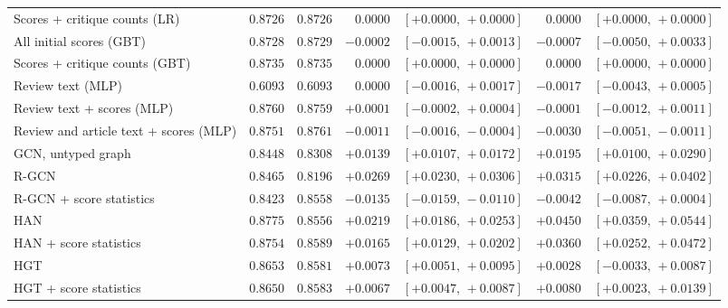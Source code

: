 \begin{table}[t]
\begin{tabular}{@{}lrrrrrr@{}}
Scores + critique counts (LR) & $0.8726$ & $0.8726$ & $0.0000$ & $[+0.0000,\,+0.0000]$ & $0.0000$ & $[+0.0000,\,+0.0000]$ \\
All initial scores (GBT) & $0.8728$ & $0.8729$ & $-0.0002$ & $[-0.0015,\,+0.0013]$ & $-0.0007$ & $[-0.0050,\,+0.0033]$ \\
Scores + critique counts (GBT) & $0.8735$ & $0.8735$ & $0.0000$ & $[+0.0000,\,+0.0000]$ & $0.0000$ & $[+0.0000,\,+0.0000]$ \\
Review text (MLP) & $0.6093$ & $0.6093$ & $0.0000$ & $[-0.0016,\,+0.0017]$ & $-0.0017$ & $[-0.0043,\,+0.0005]$ \\
Review text + scores (MLP) & $0.8760$ & $0.8759$ & $+0.0001$ & $[-0.0002,\,+0.0004]$ & $-0.0001$ & $[-0.0012,\,+0.0011]$ \\
Review and article text + scores (MLP) & $0.8751$ & $0.8761$ & $-0.0011$ & $[-0.0016,\,-0.0004]$ & $-0.0030$ & $[-0.0051,\,-0.0011]$ \\
GCN, untyped graph & $0.8448$ & $0.8308$ & $+0.0139$ & $[+0.0107,\,+0.0172]$ & $+0.0195$ & $[+0.0100,\,+0.0290]$ \\
R-GCN & $0.8465$ & $0.8196$ & $+0.0269$ & $[+0.0230,\,+0.0306]$ & $+0.0315$ & $[+0.0226,\,+0.0402]$ \\
R-GCN + score statistics & $0.8423$ & $0.8558$ & $-0.0135$ & $[-0.0159,\,-0.0110]$ & $-0.0042$ & $[-0.0087,\,+0.0004]$ \\
HAN & $0.8775$ & $0.8556$ & $+0.0219$ & $[+0.0186,\,+0.0253]$ & $+0.0450$ & $[+0.0359,\,+0.0544]$ \\
HAN + score statistics & $0.8754$ & $0.8589$ & $+0.0165$ & $[+0.0129,\,+0.0202]$ & $+0.0360$ & $[+0.0252,\,+0.0472]$ \\
HGT & $0.8653$ & $0.8581$ & $+0.0073$ & $[+0.0051,\,+0.0095]$ & $+0.0028$ & $[-0.0033,\,+0.0087]$ \\
HGT + score statistics & $0.8650$ & $0.8583$ & $+0.0067$ & $[+0.0047,\,+0.0087]$ & $+0.0080$ & $[+0.0023,\,+0.0139]$ \\
\bottomrule
\end{tabular}
\end{table}
